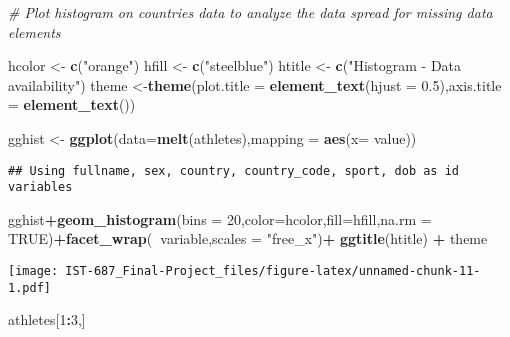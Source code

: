 \documentclass[]{article}
\newenvironment{Shaded}{\begin{snugshade}}{\end{snugshade}}
\newcommand{\CommentTok}[1]{\textcolor[rgb]{0.56,0.35,0.01}{\textit{#1}}}
\newcommand{\DataTypeTok}[1]{\textcolor[rgb]{0.13,0.29,0.53}{#1}}
\newcommand{\DecValTok}[1]{\textcolor[rgb]{0.00,0.00,0.81}{#1}}
\newcommand{\FloatTok}[1]{\textcolor[rgb]{0.00,0.00,0.81}{#1}}
\newcommand{\KeywordTok}[1]{\textcolor[rgb]{0.13,0.29,0.53}{\textbf{#1}}}
\newcommand{\NormalTok}[1]{#1}
\newcommand{\OperatorTok}[1]{\textcolor[rgb]{0.81,0.36,0.00}{\textbf{#1}}}
\newcommand{\OtherTok}[1]{\textcolor[rgb]{0.56,0.35,0.01}{#1}}
\newcommand{\StringTok}[1]{\textcolor[rgb]{0.31,0.60,0.02}{#1}}
\begin{document}
\begin{Shaded}
\begin{Highlighting}[]
\CommentTok{# Plot histogram on countries data to analyze the data spread for missing data elements}

\NormalTok{  hcolor <-}\StringTok{ }\KeywordTok{c}\NormalTok{(}\StringTok{"orange"}\NormalTok{)}
\NormalTok{  hfill <-}\StringTok{ }\KeywordTok{c}\NormalTok{(}\StringTok{"steelblue"}\NormalTok{)}
\NormalTok{  htitle <-}\StringTok{ }\KeywordTok{c}\NormalTok{(}\StringTok{"Histogram - Data availability"}\NormalTok{)}
\NormalTok{  theme <-}\KeywordTok{theme}\NormalTok{(}\DataTypeTok{plot.title =} \KeywordTok{element_text}\NormalTok{(}\DataTypeTok{hjust =} \FloatTok{0.5}\NormalTok{),}\DataTypeTok{axis.title =} \KeywordTok{element_text}\NormalTok{())}
  
\NormalTok{  gghist <-}\StringTok{ }\KeywordTok{ggplot}\NormalTok{(}\DataTypeTok{data=}\KeywordTok{melt}\NormalTok{(athletes),}\DataTypeTok{mapping =} \KeywordTok{aes}\NormalTok{(}\DataTypeTok{x=}\NormalTok{ value)) }
\end{Highlighting}
\end{Shaded}

\begin{verbatim}
## Using fullname, sex, country, country_code, sport, dob as id variables
\end{verbatim}

\begin{Shaded}
\begin{Highlighting}[]
\NormalTok{  gghist}\OperatorTok{+}\KeywordTok{geom_histogram}\NormalTok{(}\DataTypeTok{bins =} \DecValTok{20}\NormalTok{,}\DataTypeTok{color=}\NormalTok{hcolor,}\DataTypeTok{fill=}\NormalTok{hfill,}\DataTypeTok{na.rm =} \OtherTok{TRUE}\NormalTok{)}\OperatorTok{+}\KeywordTok{facet_wrap}\NormalTok{(}\OperatorTok{~}\NormalTok{variable,}\DataTypeTok{scales =} \StringTok{"free_x"}\NormalTok{)}\OperatorTok{+}\StringTok{ }\KeywordTok{ggtitle}\NormalTok{(htitle) }\OperatorTok{+}\StringTok{ }\NormalTok{theme}
\end{Highlighting}
\end{Shaded}

\texttt{[image: IST-687\_Final-Project\_files/figure-latex/unnamed-chunk-11-1.pdf]}

\begin{Shaded}
\begin{Highlighting}[]
\NormalTok{athletes[}\DecValTok{1}\OperatorTok{:}\DecValTok{3}\NormalTok{,]}
\end{Highlighting}
\end{Shaded}
\end{document}
